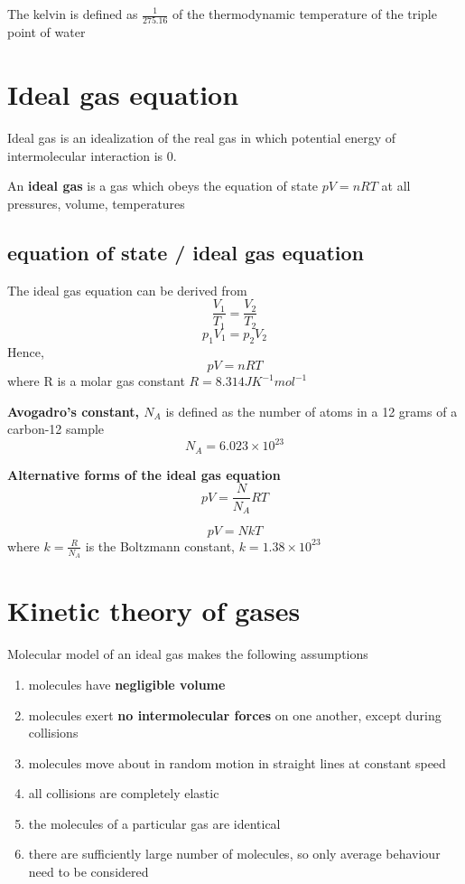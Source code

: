 \documentclass[a4paper, 10pt]{article}
\begin{document}
\begin{framed}
   The kelvin is defined as $\frac{1}{275.16}$ of the thermodynamic temperature of the triple point of water
\end{framed}	

\section{Ideal gas equation}
Ideal gas is an idealization of the real gas in which potential energy of intermolecular interaction is 0. 

\begin{framed}
   An \textbf{ideal gas} is a gas which obeys the equation of state $pV = nRT$  at all pressures, volume, temperatures
\end{framed}	

\subsection{equation of state / ideal gas equation}
The ideal gas equation can be derived from 
\[
\frac{V_1}{T_1} = \frac{V_2}{T_2}
\]
\[
   p_1V_1 = p_2 V_2
\]
Hence, 
\[
pV = nRT
\]
where R is a molar gas constant $R = 8.314J K^{-1} mol^{-1}$ 


\textbf{Avogadro's constant, $N_A$} is defined as the number of atoms in a 12 grams of a carbon-12 sample
\[
   N_A = 6.023 \times 10 ^{23}
\]

\textbf{Alternative forms of the ideal gas equation}
\[
pV = \frac{N}{N_A} RT
\]

\[
pV = NkT 
\]
where $k = \frac{R}{N_A}$ is the Boltzmann constant, $k = 1.38 \times 10^{23}$ 

\section{Kinetic theory of gases}

Molecular model of an ideal gas makes the following assumptions
\begin{enumerate}
   \item molecules have \textbf{negligible volume}
   \item molecules exert \textbf{no intermolecular forces} on one another, except during collisions
   \item molecules move about in random motion in straight lines at constant speed
   \item all collisions are completely elastic
   \item the molecules of a particular gas are identical
   \item there are sufficiently large number of molecules, so only average behaviour need to be considered
\end{enumerate}	
\end{document}
